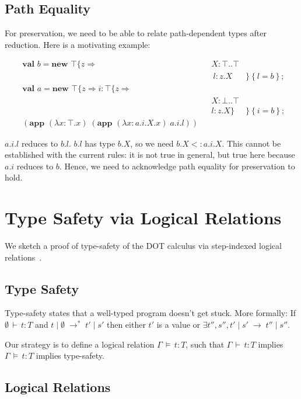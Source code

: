 \documentclass[9pt]{sigplanconf}
\newcommand{\ts}{\,\vdash\,}
\newcommand{\typ}{:}
\newcommand{\reduces}{\;\rightarrow\;}
\newcommand{\mlrefine}[2]{\{#1 \Rightarrow #2 \}}
\newcommand{\ldefs}[1]{\left\{#1\right\}}
\newcommand{\abs}[3]{\lambda #1\!:\!#2.#3}
\newcommand{\mlnew}[3]{\textbf{val }#1 = \textbf{new }#2 ;\;\\&#3}
\newcommand{\Ldecl}[3]{#1 : #2..#3}%
\newcommand{\ldecl}[2]{#1 : #2}
\newcommand{\Top}{\top}%
\newcommand{\Bot}{\bot}%
\newcommand{\reduction}[4]{#1 \operatorname{|} #2 \reduces #3 \operatorname{|} #4}
\newcommand{\app}[2]{(\textbf{app }#1\;#2)}
\newcommand{\reductionl}[5]{#1 \operatorname{|} #2 \;\rightarrow^{#5}\; #3 \operatorname{|} #4}
\newcommand{\ds}{\,\vDash\,}
\begin{document}
\subsection{Path Equality}\label{patheq}

For preservation, we need to be able to relate path-dependent types
after reduction. Here is a motivating example:

\begin{align*}
&\mlnew b {\Top \mlrefine z {&&\Ldecl X \Top \Top&\\
&&&\ \ldecl l {z.X}&}\ldefs{l = b}}{
\mlnew a {\Top \mlrefine z {\ldecl i {\Top \mlrefine z {&&&\\
&&&\Ldecl X \Bot \Top\\
&&&\ldecl l {z.X}}}&}\ldefs{i = b}}}{
\app {(\abs x \Top x)} {\app {(\abs x {a.i.X} x)} {a.i.l}}}
\end{align*}

$a.i.l$ reduces to $b.l$. $b.l$ has type $b.X$, so we need $b.X <:
a.i.X$. This cannot be established with the current rules: it is not
true in general, but true here because $a.i$ reduces to $b$. Hence,
we need to acknowledge path equality for preservation to hold.

\section{Type Safety via Logical Relations}\label{dot-type-safety}
We sketch a proof of type-safety of the DOT calculus via step-indexed
logical relations~\cite{ahmed04,ahmed06,step_indexed_obj}.

\subsection{Type Safety}
Type-safety states that a well-typed program doesn't get stuck. More
formally: If $\emptyset \ts t \typ T$ and $\reductionl t \emptyset {t'} {s'} *$ then
either $t'$ is a value or $\exists t'', s'', \reduction {t'} {s'}
{t''} {s''}$.

Our strategy is to define a logical relation $\Gamma \ds t : T$, such
that $\Gamma \ts t : T$ implies $\Gamma \ds t : T$ implies
type-safety.

\subsection{Logical Relations}
\end{document}
